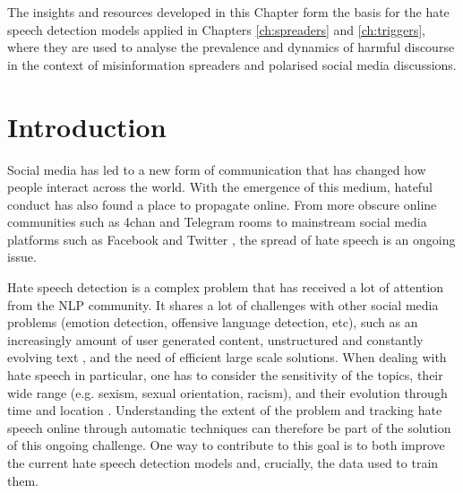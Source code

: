 The insights and resources developed in this Chapter form the basis for the hate speech detection models applied in Chapters \ref{ch:spreaders} and \ref{ch:triggers}, where they are used to analyse the prevalence and dynamics of harmful discourse in the context of misinformation spreaders and polarised social media discussions.



\section{Introduction}
Social media has led to a new form of communication that has changed how people interact across the world. With the emergence of this medium, hateful conduct has also found a place to propagate online. From more obscure online communities such as 4chan \cite{knuttila2011user} and Telegram rooms \cite{walther2021us} to mainstream social media platforms such as Facebook \cite{del2017hate} and Twitter \cite{udanor2019combating}, the spread of hate speech is an ongoing issue. 

Hate speech detection is a complex problem that has received a lot of attention from the \ac{NLP} community. It shares a lot of challenges with other social media problems (emotion detection, offensive language detection, etc),  such as an increasingly amount of user generated content, unstructured  \cite{elsayed2019proposed} and constantly evolving text \cite{ebadi2021understanding}, and the need of efficient large scale solutions. When dealing with hate speech in particular, one has to consider the sensitivity of the topics, their wide range (e.g. sexism, sexual orientation, racism), and their evolution through time and location \cite{matamoros2021racism}. Understanding the extent of the problem and tracking hate speech online through automatic techniques can therefore be part of the solution of this ongoing challenge. One way to contribute to this goal is to both improve the current hate speech detection models and, crucially, the data used to train them.

